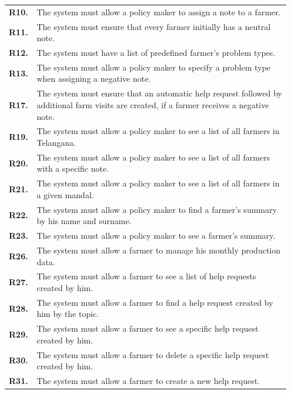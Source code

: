 \begin{longtable}{p{0.07\linewidth} p{0.88\linewidth}}
	\textbf{R10.} & The system must allow a policy maker to assign a note to a farmer.\\
	\textbf{R11.} & The system must ensure that every farmer initially has a neutral note.\\
	\textbf{R12.} & The system must have a list of predefined farmer's problem types.\\
    \textbf{R13.} & The system must allow a policy maker to specify a problem type when assigning a negative note.\\
    \textbf{R17.} & The system must ensure that an automatic help request followed by additional farm visits are created, if a farmer receives a negative note.\\
	\textbf{R19.} & The system must allow a policy maker to see a list of all farmers in Telangana.\\
	\textbf{R20.} & The system must allow a policy maker to see a list of all farmers with a specific note.\\
	\textbf{R21.} & The system must allow a policy maker to see a list of all farmers in a given mandal.\\
	\textbf{R22.} & The system must allow a policy maker to find a farmer's summary by his name and surname.\\
	\textbf{R23.} & The system must allow a policy maker to see a farmer's summary.\\
	
	\textbf{R26.} & The system must allow a farmer to manage his monthly production data.\\
	\textbf{R27.} & The system must allow a farmer to see a list of help requests created by him.\\
	\textbf{R28.} & The system must allow a farmer to find a help request created by him by the topic.\\
	\textbf{R29.} & The system must allow a farmer to see a specific help request created by him.\\
	\textbf{R30.} & The system must allow a farmer to delete a specific help request created by him.\\
	\textbf{R31.} & The system must allow a farmer to create a new help request.\\
	

\end{longtable}
